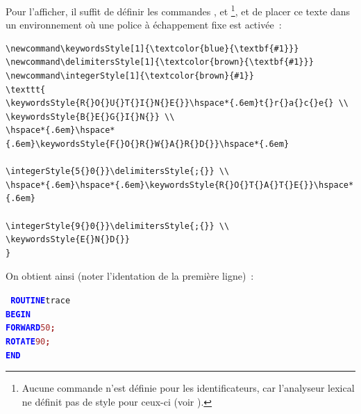 Pour l'afficher, il suffit de définir les commandes ,  et \footnote{Aucune commande n'est définie pour les identificateurs, car l'analyseur lexical ne définit pas de style pour ceux-ci (voir ).}, et de placer ce texte dans un environnement où une police à échappement fixe est activée~:



{\small
\begin{verbatim}
\newcommand\keywordsStyle[1]{\textcolor{blue}{\textbf{#1}}}
\newcommand\delimitersStyle[1]{\textcolor{brown}{\textbf{#1}}}
\newcommand\integerStyle[1]{\textcolor{brown}{#1}}
\texttt{
\keywordsStyle{R{}O{}U{}T{}I{}N{}E{}}\hspace*{.6em}t{}r{}a{}c{}e{} \\
\keywordsStyle{B{}E{}G{}I{}N{}} \\
\hspace*{.6em}\hspace*{.6em}\keywordsStyle{F{}O{}R{}W{}A{}R{}D{}}\hspace*{.6em}
                                  \integerStyle{5{}0{}}\delimitersStyle{;{}} \\
\hspace*{.6em}\hspace*{.6em}\keywordsStyle{R{}O{}T{}A{}T{}E{}}\hspace*{.6em}
                                  \integerStyle{9{}0{}}\delimitersStyle{;{}} \\
\keywordsStyle{E{}N{}D{}}
}
\end{verbatim}
}

On obtient ainsi (noter l'identation de la première ligne)~:

\texttt{
\textcolor{blue}{\bf ROUTINE}\hspace*{.6em}t{}r{}a{}c{}e{} \\
\textcolor{blue}{\bf BEGIN} \\
\hspace*{1.2em}\textcolor{blue}{\bf FORWARD}\hspace*{.6em}\textcolor{brown}{5{}0{}}\textcolor{brown}{\bf ;} \\
\hspace*{1.2em}\textcolor{blue}{\bf ROTATE}\hspace*{.6em}\textcolor{brown}{9{}0{}}\textcolor{brown}{\bf ;} \\
\textcolor{blue}{\bf END}
}


